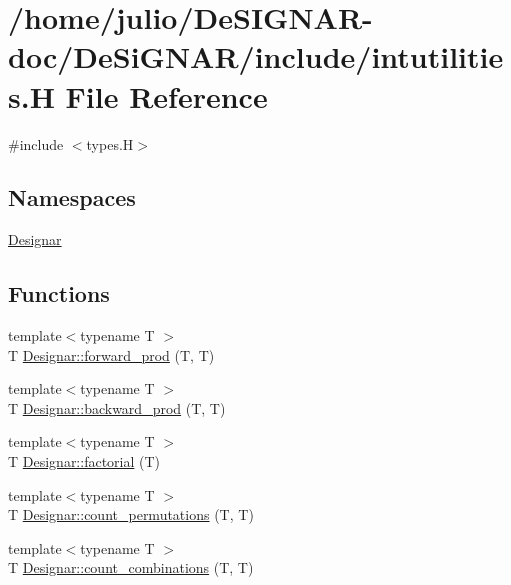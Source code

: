 \hypertarget{intutilities_8_h}{}\section{/home/julio/\+De\+S\+I\+G\+N\+A\+R-\/doc/\+De\+Si\+G\+N\+A\+R/include/intutilities.H File Reference}
\label{intutilities_8_h}
{\ttfamily \#include $<$types.\+H$>$}\newline
\subsection*{Namespaces}
\begin{DoxyCompactItemize}
\item 
 \hyperlink{namespace_designar}{Designar}
\end{DoxyCompactItemize}
\subsection*{Functions}
\begin{DoxyCompactItemize}
\item 
{\footnotesize template$<$typename T $>$ }\\T \hyperlink{namespace_designar_a38bdfe24d16d5f665e10d75834cded69}{Designar\+::forward\+\_\+prod} (T, T)
\item 
{\footnotesize template$<$typename T $>$ }\\T \hyperlink{namespace_designar_aed558aafc7789fb59b2381d0894b51cb}{Designar\+::backward\+\_\+prod} (T, T)
\item 
{\footnotesize template$<$typename T $>$ }\\T \hyperlink{namespace_designar_a7760d03bc384dbf96c672da4848b4910}{Designar\+::factorial} (T)
\item 
{\footnotesize template$<$typename T $>$ }\\T \hyperlink{namespace_designar_a9de2f2da31210c49529db21c84162576}{Designar\+::count\+\_\+permutations} (T, T)
\item 
{\footnotesize template$<$typename T $>$ }\\T \hyperlink{namespace_designar_ad5ab5ff3ec3c98286d6a9ff3a06b8d19}{Designar\+::count\+\_\+combinations} (T, T)
\end{DoxyCompactItemize}
